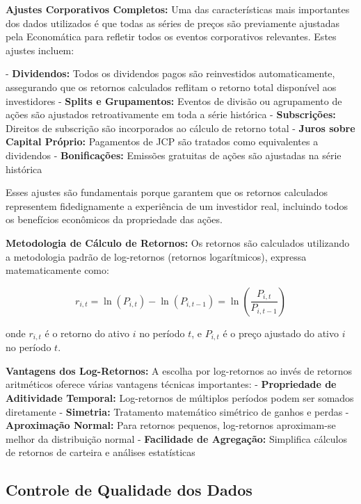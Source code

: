 \textbf{Ajustes Corporativos Completos:} Uma das características mais importantes dos dados utilizados é que todas as séries de preços são previamente ajustadas pela Economática para refletir todos os eventos corporativos relevantes. Estes ajustes incluem:

- \textbf{Dividendos:} Todos os dividendos pagos são reinvestidos automaticamente, assegurando que os retornos calculados reflitam o retorno total disponível aos investidores
- \textbf{Splits e Grupamentos:} Eventos de divisão ou agrupamento de ações são ajustados retroativamente em toda a série histórica
- \textbf{Subscrições:} Direitos de subscrição são incorporados ao cálculo de retorno total
- \textbf{Juros sobre Capital Próprio:} Pagamentos de JCP são tratados como equivalentes a dividendos
- \textbf{Bonificações:} Emissões gratuitas de ações são ajustadas na série histórica

Esses ajustes são fundamentais porque garantem que os retornos calculados representem fidedignamente a experiência de um investidor real, incluindo todos os benefícios econômicos da propriedade das ações.

\textbf{Metodologia de Cálculo de Retornos:} Os retornos são calculados utilizando a metodologia padrão de log-retornos (retornos logarítmicos), expressa matematicamente como:

\begin{equation}
r_{i,t} = \ln(P_{i,t}) - \ln(P_{i,t-1}) = \ln\left(\frac{P_{i,t}}{P_{i,t-1}}\right)
\end{equation}

onde $r_{i,t}$ é o retorno do ativo $i$ no período $t$, e $P_{i,t}$ é o preço ajustado do ativo $i$ no período $t$.

\textbf{Vantagens dos Log-Retornos:} A escolha por log-retornos ao invés de retornos aritméticos oferece várias vantagens técnicas importantes:
- \textbf{Propriedade de Aditividade Temporal:} Log-retornos de múltiplos períodos podem ser somados diretamente
- \textbf{Simetria:} Tratamento matemático simétrico de ganhos e perdas
- \textbf{Aproximação Normal:} Para retornos pequenos, log-retornos aproximam-se melhor da distribuição normal
- \textbf{Facilidade de Agregação:} Simplifica cálculos de retornos de carteira e análises estatísticas

\subsection{Controle de Qualidade dos Dados}

